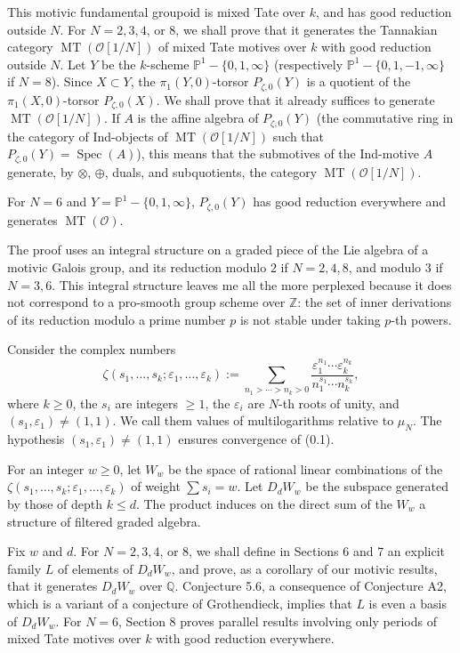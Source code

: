 \documentclass[10pt,a4paper]{article}
\newcommand{\Q}{\mathbb Q}
\newcommand{\Z}{\mathbb Z}
\newcommand{\Pone}{\mathbb P^1}
\newcommand{\Spec}{\operatorname{Spec}}
\newcommand{\MT}{\operatorname{MT}}
\newcommand{\OO}{\mathcal O}
\theoremstyle{deligne}
\begin{document}
This motivic fundamental groupoid is mixed Tate over \(k\), and has good reduction outside \(N\). For \(N=2,3,4\), or \(8\), we shall prove that it generates the Tannakian category \(\MT(\OO[1/N])\) of mixed Tate motives over \(k\) with good reduction outside \(N\). Let \(Y\) be the \(k\)-scheme \(\Pone-\{0,1,\infty\}\) (respectively \(\Pone-\{0,1,-1,\infty\}\) if \(N=8\)). Since \(X\subset Y\), the \(\pi_1(Y,0)\)-torsor \(P_{\zeta,0}(Y)\) is a quotient of the \(\pi_1(X,0)\)-torsor \(P_{\zeta,0}(X)\). We shall prove that it already suffices to generate \(\MT(\OO[1/N])\). If \(A\) is the affine algebra of \(P_{\zeta,0}(Y)\) (the commutative ring in the category of Ind-objects of \(\MT(\OO[1/N])\) such that \(P_{\zeta,0}(Y)=\Spec(A)\)), this means that the submotives of the Ind-motive \(A\) generate, by \(\otimes\), \(\oplus\), duals, and subquotients, the category \(\MT(\OO[1/N])\).

For \(N=6\) and \(Y=\Pone-\{0,1,\infty\}\), \(P_{\zeta,0}(Y)\) has good reduction everywhere and generates \(\MT(\OO)\).

The proof uses an integral structure on a graded piece of the Lie algebra of a motivic Galois group, and its reduction modulo \(2\) if \(N=2,4,8\), and modulo \(3\) if \(N=3,6\). This integral structure leaves me all the more perplexed because it does not correspond to a pro-smooth group scheme over \(\Z\): the set of inner derivations of its reduction modulo a prime number \(p\) is not stable under taking \(p\)-th powers.

Consider the complex numbers
\[
\tag{0.1}
\zeta(s_1,\ldots,s_k;\varepsilon_1,\ldots,\varepsilon_k)
:=
\sum_{n_1>\cdots>n_k>0}
\frac{\varepsilon_1^{n_1}\cdots \varepsilon_k^{n_k}}
     {n_1^{s_1}\cdots n_k^{s_k}},
\]
where \(k\ge0\), the \(s_i\) are integers \(\ge1\), the \(\varepsilon_i\) are \(N\)-th roots of unity, and \((s_1,\varepsilon_1)\ne(1,1)\). We call them values of multilogarithms relative to \(\mu_N\). The hypothesis \((s_1,\varepsilon_1)\ne(1,1)\) ensures convergence of (0.1).

For an integer \(w\ge0\), let \(W_w\) be the space of rational linear combinations of the \(\zeta(s_1,\ldots,s_k;\varepsilon_1,\ldots,\varepsilon_k)\) of weight \(\sum s_i=w\). Let \(D_dW_w\) be the subspace generated by those of depth \(k\le d\). The product induces on the direct sum of the \(W_w\) a structure of filtered graded algebra.

Fix \(w\) and \(d\). For \(N=2,3,4\), or \(8\), we shall define in Sections 6 and 7 an explicit family \(L\) of elements of \(D_dW_w\), and prove, as a corollary of our motivic results, that it generates \(D_dW_w\) over \(\Q\). Conjecture 5.6, a consequence of Conjecture A2, which is a variant of a conjecture of Grothendieck, implies that \(L\) is even a basis of \(D_dW_w\). For \(N=6\), Section 8 proves parallel results involving only periods of mixed Tate motives over \(k\) with good reduction everywhere.
\end{document}
